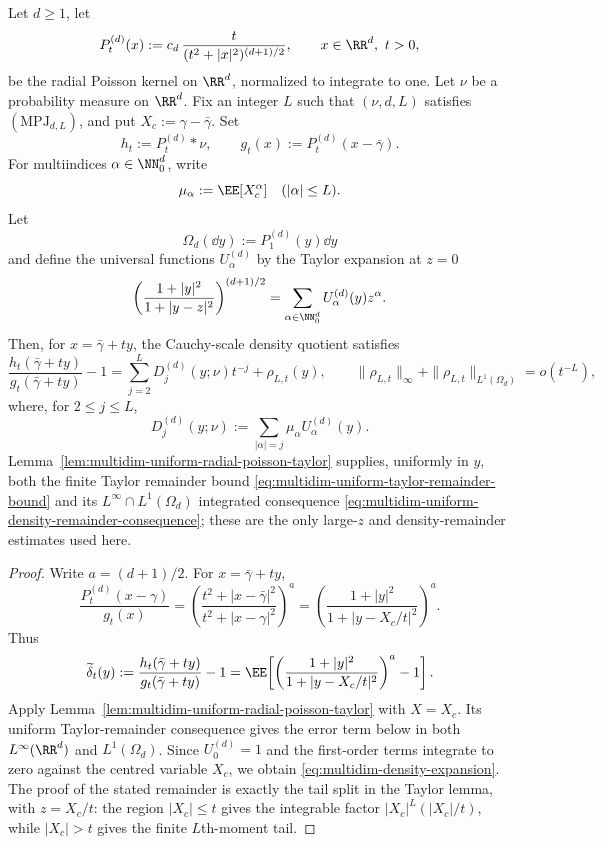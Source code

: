 \begin{theorem}%
\label{thm:multidimensional-density-quotient}
Let \(d\ge1\), let
\[
P_t^{(d)}(x):=c_d\,\frac{t}{(t^2+|x|^2)^{(d+1)/2}},
\qquad x\in\RR^d,\ t>0,
\]
be the radial Poisson kernel on \(\RR^d\), normalized to integrate to one.
Let \(\nu\) be a probability measure on \(\RR^d\).  Fix an integer \(L\)
such that \((\nu,d,L)\) satisfies
\((\mathrm{MPJ}_{d,L})\), and put
\(X_c:=\gamma-\bar{\gamma}\).  Set
\[
h_t:=P_t^{(d)}*\nu,\qquad
g_t(x):=P_t^{(d)}(x-\bar{\gamma}).
\]
For multiindices \(\alpha\in\NN_0^d\), write
\[
\mu_\alpha:=\EE[X_c^\alpha]\quad(|\alpha|\le L).
\]
Let
\[
\Omega_d(\dd y):=P_1^{(d)}(y)\dd y
\]
and define the universal functions \(U_\alpha^{(d)}\) by the Taylor expansion
at \(z=0\)
\begin{equation}\label{eq:multidim-poisson-ratio-taylor}
\left(\frac{1+|y|^2}{1+|y-z|^2}\right)^{(d+1)/2}
=\sum_{\alpha\in\NN_0^d}U_\alpha^{(d)}(y)z^\alpha .
\end{equation}
Then, for \(x=\bar{\gamma}+ty\), the Cauchy-scale density quotient satisfies
\begin{equation}\label{eq:multidim-density-expansion}
\frac{h_t(\bar{\gamma}+ty)}{g_t(\bar{\gamma}+ty)}-1
=\sum_{j=2}^{L}D_j^{(d)}(y;\nu)t^{-j}
+\rho_{L,t}(y),
\qquad
\|\rho_{L,t}\|_\infty+\|\rho_{L,t}\|_{L^1(\Omega_d)}=o(t^{-L}),
\end{equation}
where, for \(2\le j\le L\),
\begin{equation}\label{eq:multidim-density-layers}
D_j^{(d)}(y;\nu):=
\sum_{|\alpha|=j}\mu_\alpha U_\alpha^{(d)}(y).
\end{equation}
Lemma~\ref{lem:multidim-uniform-radial-poisson-taylor} supplies, uniformly
in \(y\), both the finite Taylor remainder bound
\eqref{eq:multidim-uniform-taylor-remainder-bound} and its
\(L^\infty\cap L^1(\Omega_d)\) integrated consequence
\eqref{eq:multidim-uniform-density-remainder-consequence}; these are the only
large-\(z\) and density-remainder estimates used here.
\end{theorem}

\begin{proof}
Write \(a=(d+1)/2\).  For \(x=\bar{\gamma}+ty\),
\[
\frac{P_t^{(d)}(x-\gamma)}{g_t(x)}
=
\left(\frac{t^2+|x-\bar{\gamma}|^2}{t^2+|x-\gamma|^2}\right)^a
=
\left(\frac{1+|y|^2}{1+|y-X_c/t|^2}\right)^a.
\]
Thus
\[
\widetilde\delta_t(y)
:=\frac{h_t(\bar{\gamma}+ty)}{g_t(\bar{\gamma}+ty)}-1
=\EE\!\left[
\left(\frac{1+|y|^2}{1+|y-X_c/t|^2}\right)^a-1
\right].
\]
Apply Lemma~\ref{lem:multidim-uniform-radial-poisson-taylor} with
\(X=X_c\).  Its uniform Taylor-remainder consequence gives the error term
below in both
\(L^\infty(\RR^d)\) and \(L^1(\Omega_d)\).  Since \(U_0^{(d)}=1\) and the
first-order terms integrate to zero against the centred variable \(X_c\), we
obtain \eqref{eq:multidim-density-expansion}.  The proof of the stated
remainder is exactly the tail split in the Taylor lemma, with \(z=X_c/t\):
the region \(|X_c|\le t\) gives the integrable factor
\(|X_c|^L(|X_c|/t)\), while \(|X_c|>t\) gives the finite \(L\)th-moment tail.
\end{proof}

